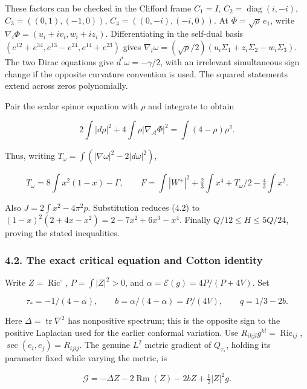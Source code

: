 \documentclass[
  10pt,
]{article}
\begin{document}
These factors can be checked in the Clifford frame \(C_1=I\),
\(C_2=\operatorname{diag}(i,-i)\), \(C_3=((0,1),(-1,0))\),
\(C_4=((0,-i),(-i,0))\). At \(\Phi=\sqrt\rho\,e_1\), write
\(\nabla_i\Phi=(u_i+iv_i,w_i+iz_i)\). Differentiating in the self-dual
basis \((e^{12}+e^{34},e^{13}-e^{24},e^{14}+e^{23})\) gives
\(\nabla_i\omega=(\sqrt\rho/2)(u_i\Sigma_1+z_i\Sigma_2-w_i\Sigma_3)\).
The two Dirac equations give \(d^*\omega=-\gamma/2\), with an irrelevant
simultaneous sign change if the opposite curvature convention is used.
The squared statements extend across zeros polynomially.

Pair the scalar spinor equation with \(\rho\) and integrate to obtain

\[
 2\int|d\rho|^2+4\int\rho|\nabla_{\mathcal A}\Phi|^2
                              =\int(4-\rho)\rho^2.
\]

Thus, writing \(T_\omega=\int(|\nabla\omega|^2-2|d\omega|^2)\),

\[
 T_\omega=8\int x^2(1-x)-\Gamma,
 \qquad
 F=\int|W^+|^2+\tfrac23\int x^4+T_\omega/2-\tfrac43\int x^2.
                                                        \tag{4.4}
\]

Also \(J=2\int x^2-4\pi^2p\). Substitution reduces (4.2) to
\((1-x)^2(2+4x-x^2)=2-7x^2+6x^3-x^4\). Finally \(Q/12\le H\le5Q/24\),
proving the stated inequalities.

\hypertarget{the-exact-critical-equation-and-cotton-identity}{%
\subsubsection{4.2. The exact critical equation and Cotton
identity}\label{the-exact-critical-equation-and-cotton-identity}}

Write \(Z=\operatorname{Ric}^{\circ}\), \(P=\int|Z|^2>0\), and
\(\alpha=\mathcal E(g)=4P/(P+4V)\). Set

\[
 \tau_*=-1/(4-\alpha),\qquad
 b=\alpha/(4-\alpha)=P/(4V),\qquad q=1/3-2b.
\]

Here \(\Delta=\operatorname{tr}\nabla^2\) has nonpositive spectrum; this
is the opposite sign to the positive Laplacian used for the earlier
conformal variation. Use \(R_{ikjl}g^{kl}=\operatorname{Ric}_{ij}\),
\(\sec(e_i,e_j)=R_{ijij}\). The genuine \(L^2\) metric gradient of
\(Q_{\tau_*}\), holding its parameter fixed while varying the metric, is

\[
 \mathcal G=-\Delta Z-2\operatorname{Rm}(Z)-2bZ
                                      +\tfrac12|Z|^2g.          \tag{4.5}
\]
\end{document}

